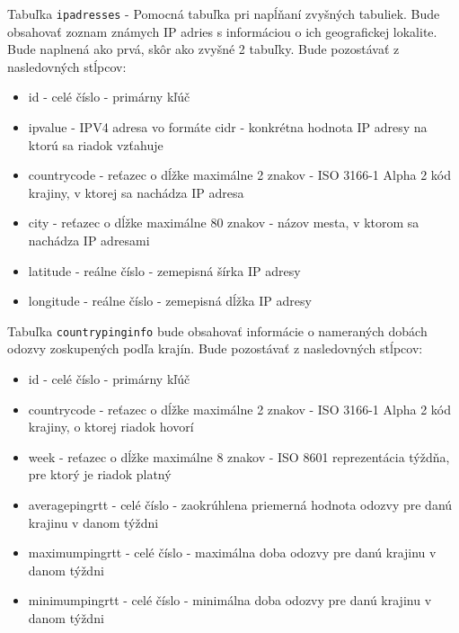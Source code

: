 Tabuľka \lstinline{ipadresses} - Pomocná tabuľka pri napĺňaní zvyšných tabuliek. Bude obsahovať zoznam známych IP adries s informáciou 
o ich geografickej lokalite. Bude naplnená ako prvá, skôr ako zvyšné 2 tabuľky. Bude pozostávať z nasledovných stĺpcov:
\begin{itemize}
    \item id - celé číslo - primárny kľúč
    \item ipvalue - IPV4 adresa vo formáte cidr - konkrétna hodnota IP adresy na ktorú sa riadok vzťahuje
    \item countrycode - reťazec o dĺžke maximálne 2 znakov - ISO 3166-1 Alpha 2 kód krajiny, v ktorej sa nachádza IP adresa
    \item city - reťazec o dĺžke maximálne 80 znakov - názov mesta, v ktorom sa nachádza IP adresami
    \item latitude - reálne číslo - zemepisná šírka IP adresy
    \item longitude - reálne číslo - zemepisná dĺžka IP adresy
\end{itemize}

Tabuľka \lstinline{countrypinginfo} bude obsahovať 
informácie o nameraných dobách odozvy zoskupených podľa krajín. Bude pozostávať z nasledovných stĺpcov:
\begin{itemize}
    \item id - celé číslo - primárny kľúč
    \item countrycode - reťazec o dĺžke maximálne 2 znakov - ISO 3166-1 Alpha 2 kód krajiny, o ktorej riadok hovorí
    \item week - reťazec o dĺžke maximálne 8 znakov - ISO 8601 reprezentácia týždňa, pre ktorý je riadok platný
    \item averagepingrtt - celé číslo - zaokrúhlena priemerná hodnota odozvy pre danú krajinu v danom týždni
    \item maximumpingrtt - celé číslo - maximálna doba odozvy pre danú krajinu v danom týždni
    \item minimumpingrtt - celé číslo - minimálna doba odozvy pre danú krajinu v danom týždni
\end{itemize}

